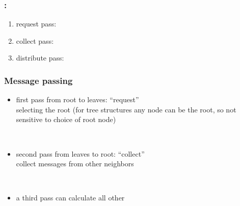 \begin{frame}\frametitle{\secname: \subsecname}

\begin{enumerate}
\item request pass: 
\item collect pass: 
\item distribute pass: 
\end{enumerate}

\end{frame}

\begin{frame} \frametitle{Message passing}
	\begin{minipage}[c]{12.1cm}
		\begin{minipage}[][1cm][c]{8cm}
			\begin{itemize}
				\item first pass from root to leaves: ``request''\\
				selecting the root (for tree structures any node can be the root, so not sensitive to choice of root node)
			\end{itemize}
		\end{minipage}
		\hfill {} \\
		\begin{minipage}[c]{8cm}
			\begin{itemize}
				\item second pass from leaves to root: ``collect''\\
				collect messages from other neighbors
			\end{itemize}
		\end{minipage}
		\hfill {} \\
		\pause
		\begin{minipage}{8cm}
			\begin{itemize}
				\item a third pass can calculate all other \\

\end{itemize}
\end{minipage}
\end{minipage}
\end{frame}
